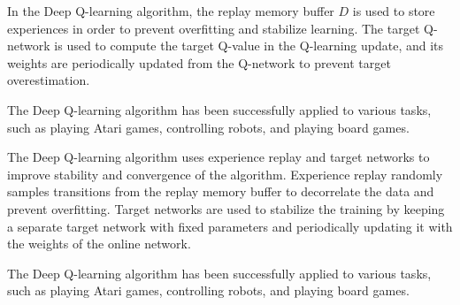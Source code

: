 \documentclass[12pt,oneside]{article}
\begin{document}
In the Deep Q-learning algorithm, the replay memory buffer $D$ is used to store experiences in order to prevent overfitting and stabilize learning. The target Q-network is used to compute the target Q-value in the Q-learning update, and its weights are periodically updated from the Q-network to prevent target overestimation.

The Deep Q-learning algorithm has been successfully applied to various tasks, such as playing Atari games, controlling robots, and playing board games.




The Deep Q-learning algorithm uses experience replay and target networks to improve stability and convergence of the algorithm. Experience replay randomly samples transitions from the replay memory buffer to decorrelate the data and prevent overfitting. Target networks are used to stabilize the training by keeping a separate target network with fixed parameters and periodically updating it with the weights of the online network.

The Deep Q-learning algorithm has been successfully applied to various tasks, such as playing Atari games, controlling robots, and playing board games.
\end{document}
